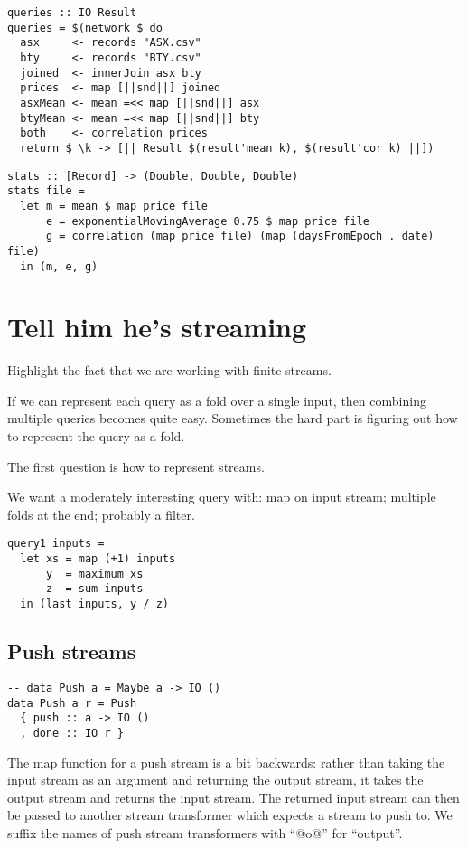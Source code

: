 \begin{lstlisting}
queries :: IO Result
queries = $(network $ do
  asx     <- records "ASX.csv"
  bty     <- records "BTY.csv"
  joined  <- innerJoin asx bty
  prices  <- map [||snd||] joined
  asxMean <- mean =<< map [||snd||] asx
  btyMean <- mean =<< map [||snd||] bty
  both    <- correlation prices
  return $ \k -> [|| Result $(result'mean k), $(result'cor k) ||])
\end{lstlisting}


\begin{lstlisting}
stats :: [Record] -> (Double, Double, Double)
stats file =
  let m = mean $ map price file
      e = exponentialMovingAverage 0.75 $ map price file
      g = correlation (map price file) (map (daysFromEpoch . date) file)
  in (m, e, g)
\end{lstlisting}

\section{Tell him he's streaming}


Highlight the fact that we are working with finite streams.

If we can represent each query as a fold over a single input, then combining multiple queries becomes quite easy.
Sometimes the hard part is figuring out how to represent the query as a fold.

The first question is how to represent streams.

We want a moderately interesting query with: map on input stream; multiple folds at the end; probably a filter.

\begin{lstlisting}
query1 inputs =
  let xs = map (+1) inputs
      y  = maximum xs
      z  = sum inputs
  in (last inputs, y / z)
\end{lstlisting}

\subsection{Push streams}


\begin{lstlisting}
-- data Push a = Maybe a -> IO ()
data Push a r = Push
  { push :: a -> IO ()
  , done :: IO r }
\end{lstlisting}

The map function for a push stream is a bit backwards: rather than taking the input stream as an argument and returning the output stream, it takes the output stream and returns the input stream.
The returned input stream can then be passed to another stream transformer which expects a stream to push to.
We suffix the names of push stream transformers with ``@o@'' for ``output''.

